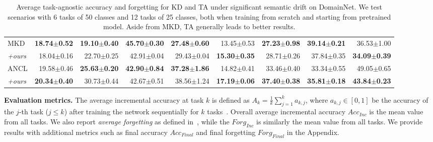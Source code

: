 \documentclass[10pt,twocolumn,letterpaper]{article}
\newcommand\rev[1]{{#1}}
\newcommand\ta{TA}
\newcommand\wu{WU}
\begin{document}
\begin{table*}[!th]
{\begin{tabular}{lrrrrrrrr}
MKD             
  & \textbf{18.74$\pm$0.52} 
  & \textbf{19.10$\pm$0.40}  
  & \textbf{45.70$\pm$0.30}    
  & \textbf{27.48$\pm$0.60 }  
  & 13.45$\pm$0.53 
  & \textbf{27.23$\pm$0.98} 
  & \textbf{39.14$\pm$0.21} 
  & 36.53$\pm$1.00  \\
  \textit{+ours } 
  & 18.04$\pm$0.16 
  & 22.70$\pm$0.25 
  & 42.91$\pm$0.04 
  & 29.43$\pm$0.04 
  &\textbf{15.30$\pm$0.35}  
  & 28.71$\pm$0.26 
  & 37.84$\pm$0.35 
  & \textbf{34.09$\pm$0.39} \\
  
  \midrule
  ANCL  & 19.58$\pm$0.46 & \textbf{25.63$\pm$0.20}  & \textbf{42.90$\pm$0.84}  & \textbf{37.28$\pm$1.86} & 14.82$\pm$0.41 & 33.46$\pm$0.40 & 33.34$\pm$0.55 & 49.05$\pm$0.65 
  \\
  \textit{+ours } & \textbf{20.34$\pm$0.40}  & 30.73$\pm$0.44 & 42.67$\pm$0.51 & 38.56$\pm$1.24 & \textbf{17.19$\pm$0.06} & \textbf{37.40$\pm$0.38} & \textbf{35.81$\pm$0.18} & \textbf{43.84$\pm$0.23}
  \\
  
 \bottomrule
\end{tabular}%
}
\caption{\rev{Average task-agnostic accuracy and forgetting for KD and TA under significant semantic drift on DomainNet. We test scenarios with 6 tasks of 50 classes and 12 tasks of 25 classes, both when training from scratch and starting from pretrained model. Aside from MKD, TA generally leads to better results.}}
\label{tab:domainnet_main}
\end{table*}
\noindent
\textbf{Evaluation metrics.}
The average incremental accuracy at task $k$ is defined as $A_{k}\!=\!\frac{1}{k} \sum_{j=1}^{k}a_{k,j}$, where
${a_{k,j}} \in [0, 1]$ be the accuracy of the $j$-th task ($j \leq k$) after training the network sequentially for $k$ tasks~\cite{aljundi2017expert}. Overall average incremental accuracy $Acc_{Inc}$ is the mean value from all tasks. We also report \textit{average forgetting} as defined in~\cite{chaudhry2018riemannian}, while the $Forg_{Inc}$ is similarly the mean value from all tasks. We provide results with additional metrics such as final accuracy $Acc_{Final}$ and final forgetting $Forg_{Final}$ in the Appendix.
\end{document}
